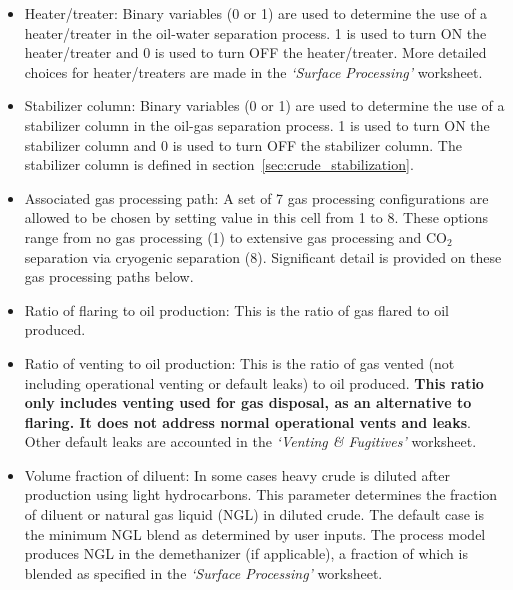 \documentclass[11pt]{report}
\newcommand{\sheet}[1]{\textit{`{#1}'}}
\begin{document}
\begin{itemize}
\item Heater/treater: Binary variables (0 or 1) are used to determine the use of a heater/treater in the oil-water separation process. 1 is used to turn ON the heater/treater and 0 is used to turn OFF the heater/treater. More detailed choices for heater/treaters are made in the \sheet{Surface Processing} worksheet.
\item Stabilizer column: Binary variables (0 or 1) are used to determine the use of a stabilizer column in the oil-gas separation process. 1 is used to turn ON the stabilizer column and 0 is used to turn OFF the stabilizer column. The stabilizer column is defined in section \,\ref{sec:crude_stabilization}. 
\item Associated gas processing path: A set of 7 gas processing configurations are allowed to be chosen by setting value in this cell from 1 to 8. These options range from no gas processing (1) to extensive gas processing and CO$_2$ separation via cryogenic separation (8).  Significant detail is provided on these gas processing paths below.
\item Ratio of flaring to oil production: This is the ratio of gas flared to oil produced. 
\item Ratio of venting to oil production: This is the ratio of gas vented (not including operational venting or default leaks) to oil produced. \textbf{This ratio only includes venting used for gas disposal, as an alternative to flaring. It does not address normal operational vents and leaks}. Other default leaks are accounted in the \sheet{Venting \& Fugitives} worksheet.
\item Volume fraction of diluent: In some cases heavy crude is diluted after production using light hydrocarbons. This parameter determines the fraction of diluent or natural gas liquid (NGL) in diluted crude. The default case is the minimum NGL blend as determined by user inputs. The process model produces NGL in the demethanizer (if applicable), a fraction of which is blended as specified in the \sheet{Surface Processing} worksheet. 
\end{itemize} 
\end{document}
